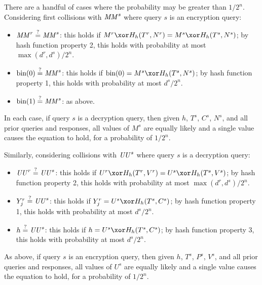 \documentclass[hctr.tex]{subfiles}
\begin{document}
There are a handful of cases where the probability may
be greater than \(1/2^n\).
Considering first collisions with \(\mathit{MM}^s\) where
query \(s\) is an encryption query:

\begin{itemize}
    \item \(\mathit{MM}^r \stackrel{\text{?}}{=} \mathit{MM}^s\):
    this holds if \(M^r \xor H_h(T^r, N^r) = M^s \xor H_h(T^s, N^s)\);
    by hash function property 2, this holds with probability at most
    \(\max(d^r, d^s)/2^n\).
    \item \(\operatorname{bin}(0) \stackrel{\text{?}}{=} \mathit{MM}^s\):
    this holds if \(\fromint(0) = M^s \xor H_h(T^s, N^s)\);
    by hash function property 1, this holds with probability at most
    \(d^s/2^n\).
    \item \(\operatorname{bin}(1) \stackrel{\text{?}}{=} \mathit{MM}^s\): as above.
\end{itemize}

In each case, if query \(s\) is a decryption query,
then given \(h\), \(T^s\), \(C^s\), \(N^s\),
and all prior queries and responses,
all values of \(M^s\) are equally likely 
and a single value causes the equation to hold,
for a probability of \(1/2^n\).

Similarly, considering collisions with \(\mathit{UU}^s\) where
query \(s\) is a decryption query:

\begin{itemize}
    \item \(\mathit{UU}^r \stackrel{\text{?}}{=} \mathit{UU}^s\): 
    this holds if \(U^r \xor H_h(T^r, V^r) = U^s \xor H_h(T^s, V^s)\);
    by hash function property 2, this holds with probability at most
    \(\max(d^r, d^s)/2^n\).
    \item \(Y_j^r \stackrel{\text{?}}{=} \mathit{UU}^s\):
    this holds if \(Y_j^r = U^s \xor H_h(T^s, C^s)\);
    by hash function property 1, this holds with probability at most
    \(d^s/2^n\).
    \item \(h \stackrel{\text{?}}{=} \mathit{UU}^s\):
    this holds if \(h = U^s \xor H_h(T^s, C^s)\);
    by hash function property 3, this holds with probability at most
    \(d^s/2^n\).
\end{itemize}

As above, if query \(s\) is an encryption query,
then given \(h\), \(T^s\), \(P^s\), \(V^s\),
and all prior queries and responses,
all values of \(U^s\) are equally likely
and a single value causes the equation to hold,
for a probability of \(1/2^n\).
\end{document}
